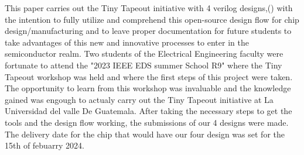 This paper carries out the Tiny Tapeout initiative with 4 verilog designs,() 
with the intention to fully utilize and comprehend this open-source design 
flow for chip design/manufacturing and to leave proper documentation for future 
students to take advantages of this new and innovative processes to enter in the 
semiconductor realm.
Two students of the Electrical Engineering faculty were fortunate to attend the 
"2023 IEEE EDS summer School R9" where the Tiny Tapeout workshop was held and 
where the first steps of this project were taken. The opportunity to learn from this 
workshop was invaluable and the knowledge gained was engough to actualy carry out the Tiny Tapeout
initiative at La Universidad del valle De Guatemala.
After taking the necessary steps to get the tools and the design flow working, the submissions
of our 4 designs were made. The delivery date for the chip that would have our four design was 
set for the 15th of febuarry 2024. 
